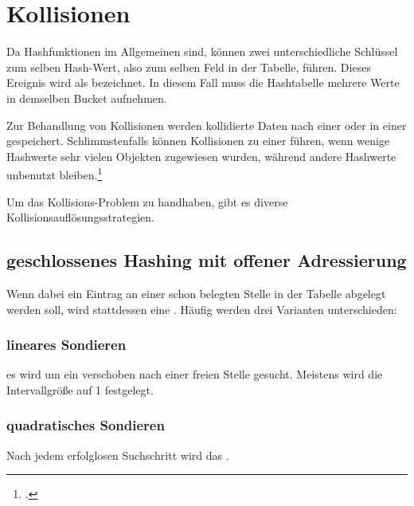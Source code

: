 \documentclass{lehramt-informatik-haupt}
\begin{document}
\section{Kollisionen}

Da Hashfunktionen im Allgemeinen 
sind, können zwei unterschiedliche Schlüssel zum selben Hash-Wert, also
zum selben Feld in der Tabelle, führen. Dieses Ereignis wird als
 bezeichnet. In diesem Fall muss die Hashtabelle
mehrere Werte in demselben Bucket aufnehmen.

Zur Behandlung von Kollisionen werden kollidierte Daten nach einer
 oder in einer
 gespeichert. Schlimmstenfalls können Kollisionen zu einer
 führen, wenn wenige Hashwerte sehr
vielen Objekten zugewiesen wurden, während andere Hashwerte unbenutzt
bleiben.\footcite{wiki:hashtabelle}

Um das Kollisions-Problem zu handhaben, gibt es diverse
Kollisionsauflösungsstrategien.

%

\subsection{geschlossenes Hashing mit offener Adressierung}

Wenn dabei ein Eintrag an einer schon belegten Stelle in der
Tabelle abgelegt werden soll, wird stattdessen eine . Häufig werden drei Varianten unterschieden:

\subsubsection{lineares Sondieren}

es wird um ein  verschoben nach einer freien
Stelle gesucht. Meistens wird die Intervallgröße auf 1 festgelegt.

\subsubsection{quadratisches Sondieren}

Nach jedem erfolglosen Suchschritt wird das .

\end{document}
